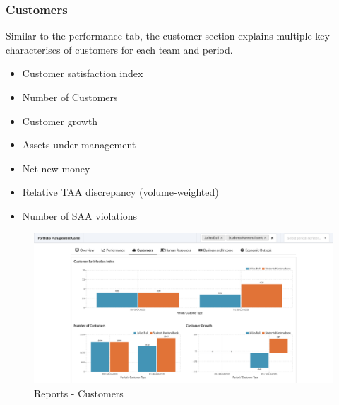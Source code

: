 \subsubsection{Customers}
Similar to the performance tab, the customer section explains multiple key characteriscs of customers for each team and period.
\begin{itemize}
  \setlength\itemsep{0.01em}
  \item Customer satisfaction index
  \item Number of Customers
  \item Customer growth
  \item Assets under management
  \item Net new money
  \item Relative TAA discrepancy (volume-weighted)
  \item Number of SAA violations
\end{itemize}
\begin{figure}[h!]
  \centering
  \includegraphics[scale=0.2]{img/application-overview/reports/03_customers.png}
  \caption{Reports - Customers}
\end{figure}

